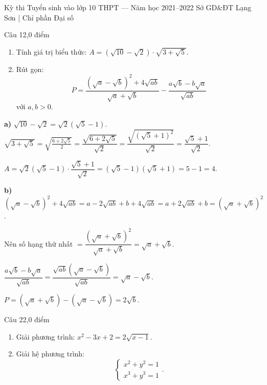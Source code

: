 ﻿%
%
  {Kỳ thi Tuyển sinh vào lớp 10 THPT — Năm học 2021--2022}%
  {Sở GD\&ĐT Lạng Sơn | Chỉ phần Đại số}

\begin{de_cau}{Câu 1}{2,0 điểm}
\begin{enumerate}[label=\alph*)]
  \item Tính giá trị biểu thức: $A = (\sqrt{10}-\sqrt{2})\cdot\sqrt{3+\sqrt{5}}$.
  \item Rút gọn:
  \[P = \dfrac{(\sqrt{a}-\sqrt{b})^2 + 4\sqrt{ab}}{\sqrt{a}+\sqrt{b}} - \dfrac{a\sqrt{b}-b\sqrt{a}}{\sqrt{ab}}\]
  với $a, b > 0$.
\end{enumerate}
\end{de_cau}

\begin{loi_giai_cau}
\textbf{a)} $\sqrt{10}-\sqrt{2}=\sqrt{2}(\sqrt{5}-1)$. $\sqrt{3+\sqrt{5}}=\sqrt{\frac{6+2\sqrt{5}}{2}}=\dfrac{\sqrt{6+2\sqrt{5}}}{\sqrt{2}}=\dfrac{\sqrt{(\sqrt{5}+1)^2}}{\sqrt{2}}=\dfrac{\sqrt{5}+1}{\sqrt{2}}$.

$A=\sqrt{2}(\sqrt{5}-1)\cdot\dfrac{\sqrt{5}+1}{\sqrt{2}}=(\sqrt{5}-1)(\sqrt{5}+1)=5-1=\boxed{4}$.

\textbf{b)} $(\sqrt{a}-\sqrt{b})^2+4\sqrt{ab}=a-2\sqrt{ab}+b+4\sqrt{ab}=a+2\sqrt{ab}+b=(\sqrt{a}+\sqrt{b})^2$.

Nên số hạng thứ nhất $=\dfrac{(\sqrt{a}+\sqrt{b})^2}{\sqrt{a}+\sqrt{b}}=\sqrt{a}+\sqrt{b}$.

$\dfrac{a\sqrt{b}-b\sqrt{a}}{\sqrt{ab}}=\dfrac{\sqrt{ab}(\sqrt{a}-\sqrt{b})}{\sqrt{ab}}=\sqrt{a}-\sqrt{b}$.

$P = (\sqrt{a}+\sqrt{b})-(\sqrt{a}-\sqrt{b})=\boxed{2\sqrt{b}}$.
\end{loi_giai_cau}

\begin{de_cau}{Câu 2}{2,0 điểm}
\begin{enumerate}[label=\alph*)]
  \item Giải phương trình: $x^2 - 3x + 2 = 2\sqrt{x-1}$.
  \item Giải hệ phương trình:
  \[\begin{cases} x^2+y^2=1 \\ x^3+y^3=1 \end{cases}.\]
\end{enumerate}
\end{de_cau}

